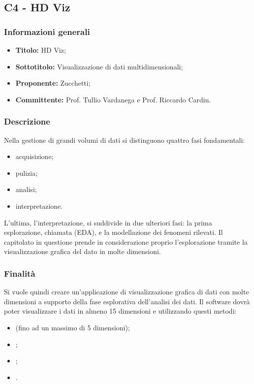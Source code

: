 \documentclass[]{article}
\begin{document}
		\newpage

		\subsection{C4 - HD Viz}
		\subsubsection{Informazioni generali}
		\begin{itemize}
			\item \textbf{Titolo:} HD Viz;
			\item \textbf{Sottotitolo:} Visualizzazione di dati multidimensionali;
			\item \textbf{Proponente:} Zucchetti;
			\item \textbf{Committente:} Prof. Tullio Vardanega e Prof. Riccardo Cardin.
		\end{itemize}

		\subsubsection{Descrizione}
		Nella gestione di grandi volumi di dati si distinguono quattro fasi fondamentali:
		\begin{itemize}
			\item acquisizione;
			\item pulizia;
			\item analisi;
			\item interpretazione.
		\end{itemize}
		L'ultima, l'interpretazione, si suddivide in due ulteriori fasi: la prima esplorazione, chiamata  (EDA), e la modellazione dei fenomeni rilevati.
		Il capitolato in questione prende in considerazione proprio l'esplorazione tramite la visualizzazione grafica del dato in molte dimensioni.

		\subsubsection{Finalità}
		Si vuole quindi creare un'applicazione di visualizzazione grafica di dati con molte dimensioni a supporto della fase esplorativa dell’analisi dei dati.
		Il software dovrà poter visualizzare i dati in almeno 15 dimensioni e utilizzando questi metodi:
		\begin{itemize}
			\item {} (fino ad un massimo di 5 dimensioni);
			\item {};
			\item {};
			\item {}.
		\end{itemize}
\end{document}
